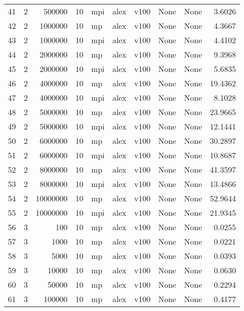 \begin{tabular}{lrrrlllllr}
41  &   2 &    500000 &      10 &  mpi &  alex &  v100 &  None &  None &   3.6026 \\
42  &   2 &   1000000 &      10 &   mp &  alex &  v100 &  None &  None &   4.3667 \\
43  &   2 &   1000000 &      10 &  mpi &  alex &  v100 &  None &  None &   4.4102 \\
44  &   2 &   2000000 &      10 &   mp &  alex &  v100 &  None &  None &   9.3968 \\
45  &   2 &   2000000 &      10 &  mpi &  alex &  v100 &  None &  None &   5.6835 \\
46  &   2 &   4000000 &      10 &   mp &  alex &  v100 &  None &  None &  19.4362 \\
47  &   2 &   4000000 &      10 &  mpi &  alex &  v100 &  None &  None &   8.1028 \\
48  &   2 &   5000000 &      10 &   mp &  alex &  v100 &  None &  None &  23.9665 \\
49  &   2 &   5000000 &      10 &  mpi &  alex &  v100 &  None &  None &  12.1441 \\
50  &   2 &   6000000 &      10 &   mp &  alex &  v100 &  None &  None &  30.2897 \\
51  &   2 &   6000000 &      10 &  mpi &  alex &  v100 &  None &  None &  10.8687 \\
52  &   2 &   8000000 &      10 &   mp &  alex &  v100 &  None &  None &  41.3597 \\
53  &   2 &   8000000 &      10 &  mpi &  alex &  v100 &  None &  None &  13.4866 \\
54  &   2 &  10000000 &      10 &   mp &  alex &  v100 &  None &  None &  52.9644 \\
55  &   2 &  10000000 &      10 &  mpi &  alex &  v100 &  None &  None &  21.9345 \\
56  &   3 &       100 &      10 &   mp &  alex &  v100 &  None &  None &   0.0255 \\
57  &   3 &      1000 &      10 &   mp &  alex &  v100 &  None &  None &   0.0221 \\
58  &   3 &      5000 &      10 &   mp &  alex &  v100 &  None &  None &   0.0393 \\
59  &   3 &     10000 &      10 &   mp &  alex &  v100 &  None &  None &   0.0630 \\
60  &   3 &     50000 &      10 &   mp &  alex &  v100 &  None &  None &   0.2294 \\
61  &   3 &    100000 &      10 &   mp &  alex &  v100 &  None &  None &   0.4177 \\

\end{tabular}
